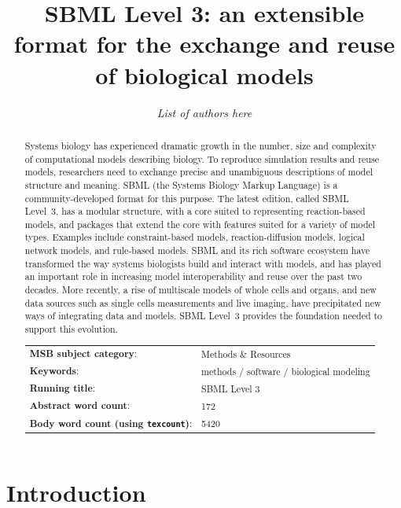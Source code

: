 \documentclass{sbml-paper}
\title{SBML Level 3: an extensible format for the exchange and reuse\\of biological models}
\author[1]{\emph{List of authors here}}
\begin{document}
\maketitle

\begin{abstract}
Systems biology has experienced dramatic growth in the number, size and complexity of computational models describing biology. To reproduce simulation results and reuse models, researchers need to exchange precise and unambiguous descriptions of model structure and meaning. SBML (the Systems Biology Markup Language) is a community-developed format for this purpose. The latest edition, called SBML Level~3, has a modular structure, with a core suited to representing reaction-based models, and packages that extend the core with features suited for a variety of model types. Examples include constraint-based models, reaction-diffusion models, logical network models, and rule-based models. SBML and its rich software ecosystem have transformed the way systems biologists build and interact with models, and has played an important role in increasing model interoperability and reuse over the past two decades. More recently, a rise of multiscale models of whole cells and organs, and new data sources such as single cells measurements and live imaging, have precipitated new ways of integrating data and models. SBML Level~3 provides the foundation needed to support this evolution.

\vspace*{0.25in}\noindent
\begin{tabular}{@{}ll@{}}
  \textbf{MSB subject category}: & Methods \& Resources \\
  \textbf{Keywords}: & methods / software / biological modeling \\
  \textbf{Running title}:        & SBML Level 3\\
  \textbf{Abstract word count}:  & 172 \\
  \textbf{Body word count (using \texttt{texcount})}: & 5420\\
\end{tabular}

\end{abstract}

\clearpage

\section*{Introduction}
\end{document}
